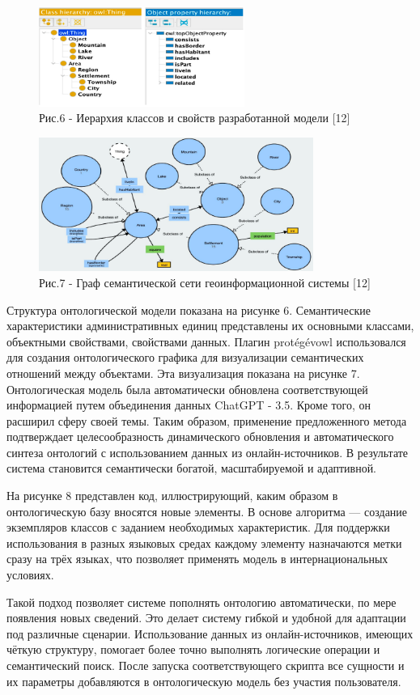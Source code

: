 \begin{figure}[H]
	\centering
	\includegraphics[width=0.6\textwidth]{media/ict2/image154}
	\caption*{Рис.6 - Иерархия классов и свойств разработанной модели {[}12{]}}
\end{figure}

\begin{figure}[H]
	\centering
	\includegraphics[width=0.8\textwidth]{media/ict2/image155}
	\caption*{Рис.7 - Граф семантической сети геоинформационной системы {[}12{]}}
\end{figure}

\begin{multicols}{2}
Структура онтологической модели показана на рисунке 6. Семантические
характеристики административных единиц представлены их основными
классами, объектными свойствами, свойствами данных. Плагин protégévowl
использовался для создания онтологического графика для визуализации
семантических отношений между объектами. Эта визуализация показана на
рисунке 7. Онтологическая модель была автоматически обновлена
соответствующей информацией путем объединения данных ChatGPT - 3.5.
Кроме того, он расширил сферу своей темы. Таким образом, применение
предложенного метода подтверждает целесообразность динамического
обновления и автоматического синтеза онтологий с использованием данных
из онлайн-источников. В результате система становится семантически
богатой, масштабируемой и адаптивной.

На рисунке 8 представлен код, иллюстрирующий, каким образом в
онтологическую базу вносятся новые элементы. В основе алгоритма ---
создание экземпляров классов с заданием необходимых характеристик. Для
поддержки использования в разных языковых средах каждому элементу
назначаются метки сразу на трёх языках, что позволяет применять модель в
интернациональных условиях.

Такой подход позволяет системе пополнять онтологию автоматически, по
мере появления новых сведений. Это делает систему гибкой и удобной для
адаптации под различные сценарии. Использование данных из
онлайн-источников, имеющих чёткую структуру, помогает более точно
выполнять логические операции и семантический поиск. После запуска
соответствующего скрипта все сущности и их параметры добавляются в
онтологическую модель без участия пользователя.
\end{multicols}

